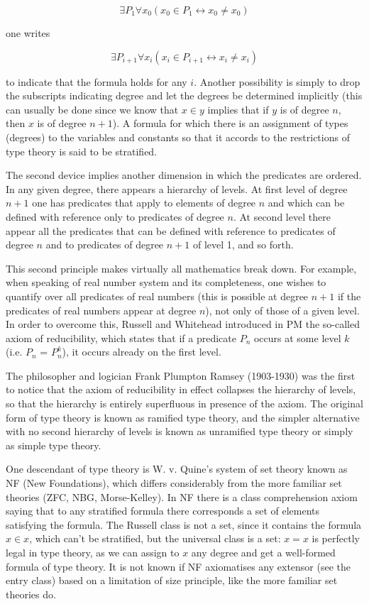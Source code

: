 \documentclass[12pt]{article}
\begin{document}
\begin{displaymath}
 \exists P_1 \forall x_0 (x_0 \in P_1 \leftrightarrow x_0 \neq x_0)
\end{displaymath}

one writes

\begin{displaymath}
 \exists P_{i+1} \forall x_i (x_i \in P_{i+1} \leftrightarrow x_i \neq x_i)
\end{displaymath}

to indicate that the formula holds for any $i$. Another possibility is simply to drop the subscripts indicating degree and let the degrees be determined implicitly (this can usually be done since we know that $x \in y$ implies that if $y$ is of degree $n$, then $x$ is of degree $n+1$). A formula for which there is an assignment of types (degrees) to the variables and constants so that it accords to the restrictions of type theory is said to be stratified.

The second device implies another dimension in which the predicates are ordered. In any given degree, there appears a hierarchy of levels. At first level of degree $n+1$ one has predicates that apply to elements of degree $n$ and which can be defined with reference only to predicates of degree $n$. At second level there appear all the predicates that can be defined with reference to predicates of degree $n$ and to predicates of degree $n+1$ of level 1, and so forth.

This second principle makes virtually all mathematics break down. For example, when speaking of real number system and its completeness, one wishes to quantify over all predicates of real numbers (this is possible at degree $n+1$ if the predicates of real numbers appear at degree $n$), not only of those of a given level. In order to overcome this, Russell and Whitehead introduced in PM the so-called axiom of reducibility, which states that if a predicate $P_n$ occurs  at some level $k$ (i.e. $P_n$ = $P_n^k$), it occurs already on the first level.

The philosopher and logician Frank Plumpton Ramsey (1903-1930) was the first to notice that the axiom of reducibility in effect collapses the hierarchy of levels, so that the hierarchy is entirely superfluous in presence of the axiom. The original form of type theory is known as ramified type theory, and the simpler alternative with no second hierarchy of levels is known as unramified type theory or simply as simple type theory.

One descendant of type theory is W. v. Quine's system of set theory known as NF (New Foundations), which differs considerably from the more familiar set theories (ZFC, NBG, Morse-Kelley). In NF there is a class comprehension axiom saying that to any stratified formula there corresponds a set of elements satisfying the formula. The Russell class is not a set, since it contains the formula $x \in x$, which can't be stratified, but the universal class is a set: $x = x$ is perfectly legal in type theory, as we can assign to $x$ any degree and get a well-formed formula of type theory. It is not known if NF axiomatises any extensor (see the entry class) based on a limitation of size principle, like the more familiar set theories do.
\end{document}
